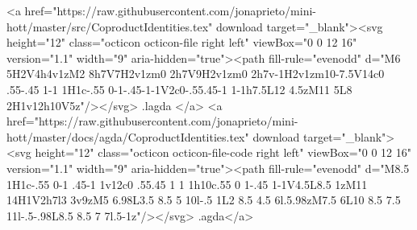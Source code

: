         <a href="https://raw.githubusercontent.com/jonaprieto/mini-hott/master/src/CoproductIdentities.tex" download target="_blank"><svg height="12" class="octicon octicon-file right left" viewBox="0 0 12 16" version="1.1" width="9" aria-hidden="true"><path fill-rule="evenodd" d="M6 5H2V4h4v1zM2 8h7V7H2v1zm0 2h7V9H2v1zm0 2h7v-1H2v1zm10-7.5V14c0 .55-.45 1-1 1H1c-.55 0-1-.45-1-1V2c0-.55.45-1 1-1h7.5L12 4.5zM11 5L8 2H1v12h10V5z"/></svg> .lagda </a>
        <a href="https://raw.githubusercontent.com/jonaprieto/mini-hott/master/docs/agda/CoproductIdentities.tex" download target="_blank"><svg height="12" class="octicon octicon-file-code right left" viewBox="0 0 12 16" version="1.1" width="9" aria-hidden="true"><path fill-rule="evenodd" d="M8.5 1H1c-.55 0-1 .45-1 1v12c0 .55.45 1 1 1h10c.55 0 1-.45 1-1V4.5L8.5 1zM11 14H1V2h7l3 3v9zM5 6.98L3.5 8.5 5 10l-.5 1L2 8.5 4.5 6l.5.98zM7.5 6L10 8.5 7.5 11l-.5-.98L8.5 8.5 7 7l.5-1z"/></svg> .agda</a>
      
